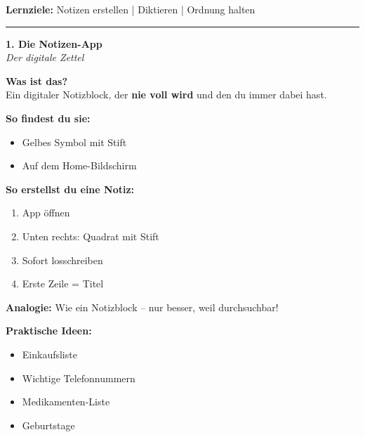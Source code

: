 \documentclass[a4paper,landscape,8pt]{extarticle}
\begin{document}

 \hfill
{\footnotesize\textbf{Lernziele:} Notizen erstellen | Diktieren | Ordnung halten}

\vspace{1mm}
\hrule
\vspace{1mm}

\begin{minipage}[t]{0.32\linewidth}
\begin{center}
\colorbox{noteyellow!30}{%
\begin{minipage}{0.95\linewidth}
\vspace{2mm}
\begin{center}
{\Large\bfseries\textcolor{noteyellow!80!black}{1. Die Notizen-App}}\\[1pt]
{\footnotesize\itshape Der digitale Zettel}
\end{center}
\vspace{2mm}
\end{minipage}%
}
\end{center}

\vspace{1mm}

\textbf{Was ist das?}\\
Ein digitaler Notizblock, der \textbf{nie voll wird} und den du immer dabei hast.

\textbf{So findest du sie:}
\begin{itemize}
\item Gelbes Symbol mit Stift
\item Auf dem Home-Bildschirm
\end{itemize}

\textbf{So erstellst du eine Notiz:}
\begin{enumerate}
\item App öffnen
\item Unten rechts: Quadrat mit Stift
\item Sofort losschreiben
\item Erste Zeile = Titel
\end{enumerate}

\textbf{Analogie:} Wie ein Notizblock -- nur besser, weil durchsuchbar!

\textbf{Praktische Ideen:}
\begin{itemize}
\item Einkaufsliste
\item Wichtige Telefonnummern
\item Medikamenten-Liste
\item Geburtstage
\end{itemize}

\end{minipage}%
\end{document}
